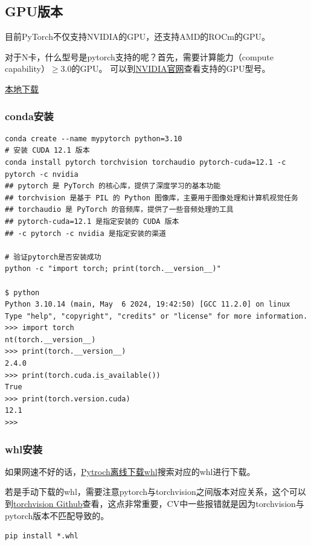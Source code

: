 \subsection{GPU版本}
目前PyTorch不仅支持NVIDIA的GPU，还支持AMD的ROCm的GPU。

对于N卡，什么型号是pytorch支持的呢？首先，需要计算能力（compute capability）$\geq$3.0的GPU。
可以到\href{https://developer.nvidia.cn/zh-cn/cuda-gpus}{NVIDIA官网}查看支持的GPU型号。


\href{https://pytorch.org/get-started/locally/}{本地下载}

\subsubsection{conda安装}
\begin{lstlisting}[style=demostyle,numbers=none]
conda create --name mypytorch python=3.10    
# 安装 CUDA 12.1 版本    
conda install pytorch torchvision torchaudio pytorch-cuda=12.1 -c pytorch -c nvidia
## pytorch 是 PyTorch 的核心库，提供了深度学习的基本功能
## torchvision 是基于 PIL 的 Python 图像库，主要用于图像处理和计算机视觉任务
## torchaudio 是 PyTorch 的音频库，提供了一些音频处理的工具
## pytorch-cuda=12.1 是指定安装的 CUDA 版本
## -c pytorch -c nvidia 是指定安装的渠道

# 验证pytorch是否安装成功
python -c "import torch; print(torch.__version__)"

$ python
Python 3.10.14 (main, May  6 2024, 19:42:50) [GCC 11.2.0] on linux
Type "help", "copyright", "credits" or "license" for more information.
>>> import torch
nt(torch.__version__)
>>> print(torch.__version__)
2.4.0
>>> print(torch.cuda.is_available())
True
>>> print(torch.version.cuda)
12.1
>>>
\end{lstlisting}

\subsubsection{whl安装}
如果网速不好的话，\href{https://download.pytorch.org/whl/torch}{Pytroch离线下载whl}搜索对应的whl进行下载。

若是手动下载的whl，需要注意pytorch与torchvision之间版本对应关系，这个可以到\href{https://github.com/pytorch/vision}{torchvision Github}查看，这点非常重要，CV中一些报错就是因为torchvision与pytorch版本不匹配导致的。
\begin{lstlisting}[style=demostyle,numbers=none]
pip install *.whl
\end{lstlisting}

